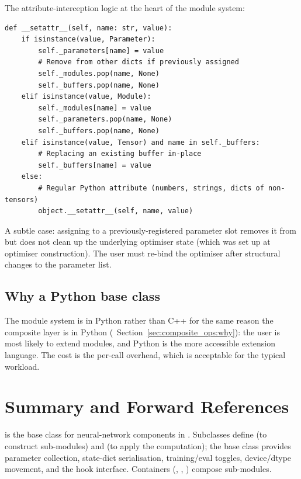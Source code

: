 The attribute-interception logic at the heart of the module
system:

\begin{lstlisting}[style=lucid,language=LucidPython]
def __setattr__(self, name: str, value):
    if isinstance(value, Parameter):
        self._parameters[name] = value
        # Remove from other dicts if previously assigned
        self._modules.pop(name, None)
        self._buffers.pop(name, None)
    elif isinstance(value, Module):
        self._modules[name] = value
        self._parameters.pop(name, None)
        self._buffers.pop(name, None)
    elif isinstance(value, Tensor) and name in self._buffers:
        # Replacing an existing buffer in-place
        self._buffers[name] = value
    else:
        # Regular Python attribute (numbers, strings, dicts of non-tensors)
        object.__setattr__(self, name, value)
\end{lstlisting}

A subtle case: assigning  to a previously-registered
parameter slot removes it from  but does not
clean up the underlying optimiser state (which was set up at
optimiser construction). The user must re-bind the optimiser
after structural changes to the parameter list.

\subsection{Why a Python base class}
\label{ssec:module_system:why_python}

The module system is in Python rather than C++ for the same reason
the composite layer is in Python
(~Section~\ref{sec:composite_ops:why}):
the user is most likely to extend modules, and Python is the more
accessible extension language. The cost is the per-call overhead,
which is acceptable for the typical workload.

\section{Summary and Forward References}
\label{sec:module_system:summary}

 is the base class for neural-network
components in \Lucid. Subclasses define  (to
construct sub-modules) and  (to apply the
computation); the base class provides parameter collection,
state-dict serialisation, training/eval toggles, device/dtype
movement, and the hook interface. Containers (,
, ) compose sub-modules.

